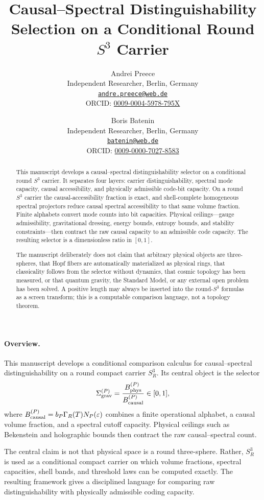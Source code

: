 \documentclass[11pt,a4paper]{article}
\title{Causal--Spectral Distinguishability Selection on a Conditional Round $S^3$ Carrier}
\author{%
\begin{tabular}{c}
Andrei Preece\\[-0.15em]
\small Independent Researcher, Berlin, Germany\\[-0.15em]
\small \href{mailto:andre.preece@web.de}{\texttt{andre.preece@web.de}}\\[-0.15em]
\small ORCID: \href{https://orcid.org/0009-0004-5978-795X}{0009-0004-5978-795X}
\end{tabular}
\and
\begin{tabular}{c}
Boris Batenin\\[-0.15em]
\small Independent Researcher, Berlin, Germany\\[-0.15em]
\small \href{mailto:batenin@web.de}{\texttt{batenin@web.de}}\\[-0.15em]
\small ORCID: \href{https://orcid.org/0009-0000-7027-8583}{0009-0000-7027-8583}
\end{tabular}
}
\date{}
\begin{document}
\maketitle

\begin{abstract}
This manuscript develops a causal--spectral distinguishability selector on a conditional round $S^3$ carrier.  It separates four layers: carrier distinguishability, spectral mode capacity, causal accessibility, and physically admissible code-bit capacity.  On a round $S^3$ carrier the causal-accessibility fraction is exact, and shell-complete homogeneous spectral projectors reduce causal spectral accessibility to that same volume fraction.  Finite alphabets convert mode counts into bit capacities.  Physical ceilings---gauge admissibility, gravitational dressing, energy bounds, entropy bounds, and stability constraints---then contract the raw causal capacity to an admissible code capacity.  The resulting selector is a dimensionless ratio in $[0,1]$.

The manuscript deliberately does not claim that arbitrary physical objects are three-spheres, that Hopf fibers are automatically materialized as physical rings, that classicality follows from the selector without dynamics, that cosmic topology has been measured, or that quantum gravity, the Standard Model, or any external open problem has been solved.  A positive length may always be inserted into the round-$S^3$ formulas as a screen transform; this is a computable comparison language, not a topology theorem.
\end{abstract}


\paragraph{Overview.}
This manuscript develops a conditional comparison calculus for causal--spectral distinguishability on a round compact carrier \(S^3_R\).  Its central object is the selector
\[
\Sigma_{\rm grav}^{(P)}
=
\frac{B_{\rm phys}^{(P)}}{B_{\rm causal}^{(P)}}\in[0,1],
\]
where \(B_{\rm causal}^{(P)}=b_P\Gamma_R(T)N_P(\varepsilon)\) combines a finite operational alphabet, a causal volume fraction, and a spectral cutoff capacity.  Physical ceilings such as Bekenstein and holographic bounds then contract the raw causal--spectral count.

The central claim is not that physical space is a round three-sphere.  Rather, \(S^3_R\) is used as a conditional compact carrier on which volume fractions, spectral capacities, shell bands, and threshold laws can be computed exactly.  The resulting framework gives a disciplined language for comparing raw distinguishability with physically admissible coding capacity.
\end{document}
